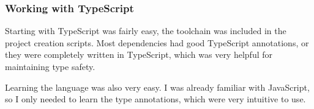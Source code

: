 \subsubsection{Working with TypeScript}\label{working-with-typescript}

Starting with TypeScript was fairly easy, the toolchain was included in
the project creation scripts. Most dependencies had good TypeScript
annotations, or they were completely written in TypeScript, which was
very helpful for maintaining type safety.

Learning the language was also very easy. I was already familiar with
JavaScript, so I only needed to learn the type annotations, which were
very intuitive to use.
